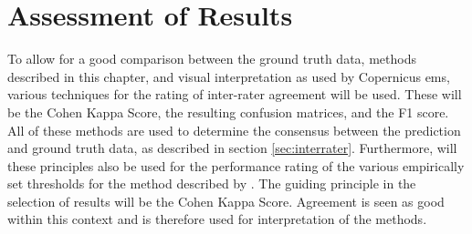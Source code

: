 \section{Assessment of Results} \label{sec:resu}
\noindent To allow for a good comparison between the ground truth data, methods described in this chapter, and visual interpretation as used by Copernicus \ac{ems}, various techniques for the rating of inter-rater agreement will be used. These will be the Cohen Kappa Score, the resulting confusion matrices, and the F1 score. All of these methods are used to determine the consensus between the prediction and ground truth data, as described in section \ref{sec:interrater}. Furthermore, will these principles also be used for the performance rating of the various empirically set thresholds for the method described by \cite{Yun2015}. The guiding principle in the selection of results will be the Cohen Kappa Score. Agreement is seen as good within this context and is therefore used for interpretation of the methods.

